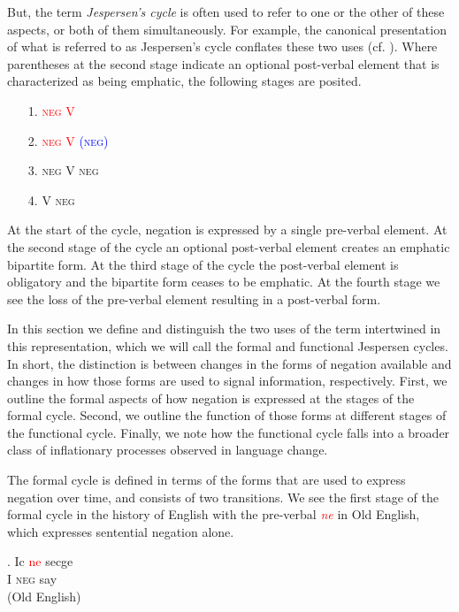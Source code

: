 \documentclass[linguex]{sp}
\theoremstyle{definition} \newtheorem{definition}{Definition}
\begin{document}
But, the term \emph{Jespersen's cycle} is often used to refer to one or the other of these aspects, or both of them simultaneously. For example, the canonical presentation of what is referred to as Jespersen's cycle conflates these two uses (cf. \citealt{posner1985,schwegler1988,ladusaw1993}). Where parentheses at the second stage indicate an optional post-verbal element that is characterized as being emphatic, the following stages are posited.

\begin{itemize}
    \item [1.] \textsc{\textcolor{red}{neg V}}
    \item [2.]  \textsc{\textcolor{red}{neg V} \textcolor{blue}{(neg)}}
    \item [3.] \textsc{\color{blue} neg V neg}
    \item [4.] \textsc{\color{green} V neg}
\end{itemize}
At the start of the cycle, negation is expressed by a single pre-verbal element. At the second stage of the cycle an optional post-verbal element creates an emphatic bipartite form. At the third stage of the cycle the post-verbal element is obligatory and the bipartite form ceases to be emphatic. At the fourth stage we see the loss of the pre-verbal element resulting in a post-verbal form.

In this section we define and distinguish the two uses of the term intertwined in this representation, which we will call the formal and functional Jespersen cycles. In short, the distinction is between changes in the forms of negation available and changes in how those forms are used to signal information, respectively.  First, we outline the formal aspects of how negation is expressed at the stages of the formal cycle. Second, we outline the function of those forms at different stages of the functional cycle. Finally, we note how the functional cycle falls into a broader class of inflationary processes observed in language change.

The formal cycle is defined in terms of the forms that are used to express negation over time, and consists of two transitions. We see the first stage of the formal cycle in the history of English with the pre-verbal \emph{\textcolor{red}{ne}} in Old English, which expresses sentential negation alone.

\exg. Ic \textcolor{red}{ne} secge\\
      I \textsc{neg} say\\
      (Old English)
\end{document}
